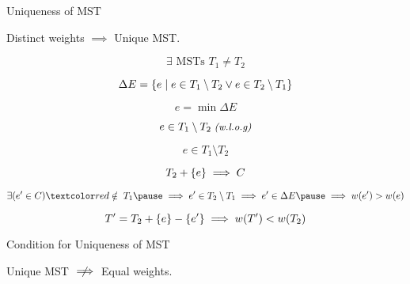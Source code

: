 
\begin{frame}{}
  \centerline{}
\end{frame}

\begin{frame}{}
  \begin{exampleblock}{Uniqueness of MST }
    \centerline{Distinct weights $\implies$ Unique MST.}
  \end{exampleblock}

  \pause
  \vspace{0.50cm}
  \centerline{}

  \pause
  \[
    \exists \text{ MSTs } T_1 \neq T_2
  \]

  \pause
  \[
    \Delta E = \{e \mid e \in T_1 \setminus T_2 \lor e \in T_2 \setminus T_1\}
  \]

  \pause
  \[
    e = \min \Delta E
  \]

  \pause
  \[
    e \in T_1 \setminus T_2 \;\text{\small \it (w.l.o.g)}
  \]
\end{frame}

\begin{frame}{}
  \[
    e \in T_1 \setminus T_2
  \]


  \pause
  \vspace{-0.30cm}
  \[
    T_2 + \{e\} \implies C
  \]

  \pause
  \vspace{-0.30cm}
  \[
    \exists (e' \in C) \red{\;\notin\; T_1} \pause \implies e' \in T_{2} \setminus T_{1} \implies e' \in \Delta E \pause \implies w(e') > w(e)
  \]

  \pause
  \vspace{-0.50cm}
  \[
    T' = T_{2} + \{e\} - \{e'\} \implies w(T') < w(T_{2})
  \]
\end{frame}

\begin{frame}{}
  \begin{exampleblock}{Condition for Uniqueness of MST }
    \centerline{Unique MST $\centernot\implies$ Equal weights.}
  \end{exampleblock}

  \pause
\end{frame}

